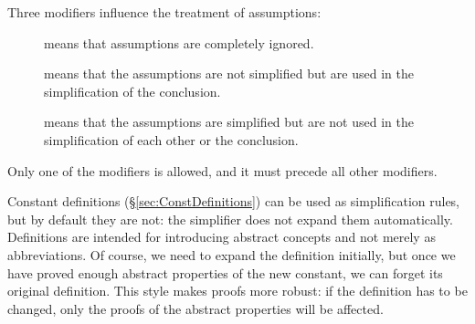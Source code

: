 \begin{isabellebody}
%
\isadelimproof
%
\endisadelimproof
%
\begin{isamarkuptext}%
\noindent
Three modifiers influence the treatment of assumptions:
\begin{description}
\item[]
 means that assumptions are completely ignored.
\item[]
 means that the assumptions are not simplified but
  are used in the simplification of the conclusion.
\item[]
 means that the assumptions are simplified but are not
  used in the simplification of each other or the conclusion.
\end{description}
Only one of the modifiers is allowed, and it must precede all
other modifiers.
\end{isamarkuptext}%
\isamarkuptrue%
%
\isamarkuptrue%
%
\begin{isamarkuptext}%
\label{sec:Simp-with-Defs}
Constant definitions (\S\ref{sec:ConstDefinitions}) can be used as
simplification rules, but by default they are not: the simplifier does not
expand them automatically.  Definitions are intended for introducing abstract
concepts and not merely as abbreviations.  Of course, we need to expand
the definition initially, but once we have proved enough abstract properties
of the new constant, we can forget its original definition.  This style makes
proofs more robust: if the definition has to be changed,
only the proofs of the abstract properties will be affected.


\end{isamarkuptext}
\end{isabellebody}
